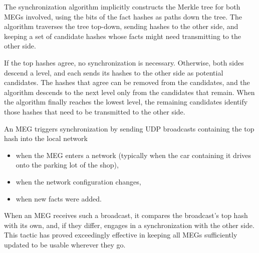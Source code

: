 \documentclass[sigplan,review]{acmart}
\begin{document}
The synchronization algorithm implicitly constructs the Merkle tree
for both MEGs involved, using the bits of the fact hashes as paths
down the tree.  The algorithm traverses the tree top-down, sending
hashes to the other side, and keeping a set of candidate hashes whose
facts might need transmitting to the other side.

If the top hashes agree, no
synchronization is necessary. Otherwise, both sides descend a
level, and each sends its hashes to the other side as potential
candidates. The hashes that agree can be removed from the
candidates, and the algorithm descends to the next level only from the
candidates that remain. When the algorithm finally reaches the lowest level, the remaining
candidates identify those hashes that need to be transmitted to the
other side.

An MEG triggers synchronization by sending UDP
broadcasts containing the top hash into the local network
%
\begin{itemize}
\item when the MEG enters a network (typically when the car containing
  it drives onto the parking lot of the shop),
\item when the network configuration changes,
\item when new facts were added.
\end{itemize}
%
When an MEG receives such a broadcast, it compares the broadcast's
top hash with its own, and, if they differ, engages in a
synchronization with the other side. This tactic has proved
exceedingly effective in keeping all MEGs sufficiently updated to be
usable wherever they go.
\end{document}
